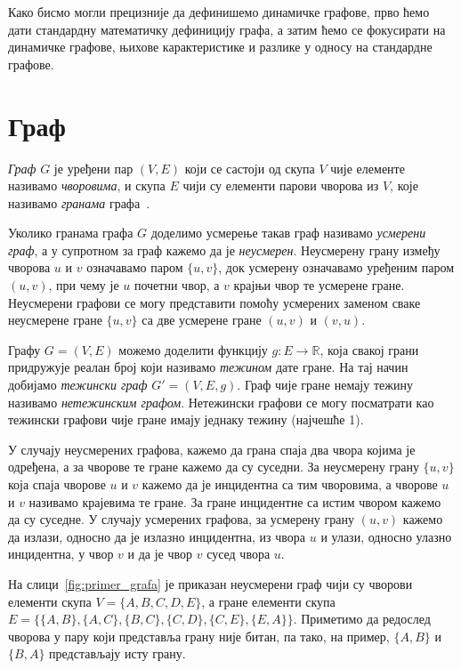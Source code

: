 
Како бисмо могли прецизније да дефинишемо динамичке графове, прво ћемо дати стандардну математичку дефиницију графа, а затим ћемо се фокусирати на динамичке графове, њихове карактеристике и разлике у односу на стандардне графове.

\section{Граф}

\textit{Граф} $G$ је уређени пар $(V,E)$ који се састоји од скупа $V$ чије елементе називамо \emph{чворовима}, и скупа $E$ чији су елементи парови чворова из $V$, које називамо \emph{гранама} графа~\cite{Stanic2020}.

Уколико гранама графа $G$ доделимо усмерење такав граф називамо \textit{усмерени граф}, а у супротном за граф кажемо да је \textit{неусмерен}. Неусмерену грану између чворова $u$ и $v$ означавамо паром $\{u,v\}$, док усмерену означавамо уређеним паром $(u,v)$, при чему је $u$ почетни чвор, а $v$ крајњи чвор те усмерене гране. Неусмерени графови се могу представити помоћу усмерених заменом сваке неусмерене гране $\{u,v\}$ са две усмерене гране $(u,v)$ и $(v,u)$.

Графу $G=(V,E)$ можемо доделити функцију $g: E \to \mathbb{R}$, која свакој грани придружује реалан број који називамо \textit{тежином} дате гране. На тај начин добијамо \textit{тежински граф} $G'=(V,E,g)$. Граф чије гране немају тежину називамо \textit{нетежинским графом}. Нетежински графови се могу посматрати као тежински графови чије гране имају једнаку тежину (најчешће 1). 

У случају неусмерених графова, кажемо да грана спаја два чвора којима је одређена, а за чворове те гране кажемо да су суседни. За неусмерену грану $\{u,v\}$ која спаја чворове $u$ и $v$ кажемо да је инцидентна са тим чворовима, а чворове $u$ и $v$ називамо крајевима те гране. За гране инцидентне са истим чвором кажемо да су суседне. У случају усмерених графова, за усмерену грану $(u,v)$ кажемо да излази, односно да је излазно инцидентна, из чвора $u$ и улази, односно улазно инцидентна, у чвор $v$ и да је чвор $v$ сусед чвора $u$. 

\begin{example}
    \label{ex:primer_neusmerenog_grafa}
    На слици~\ref{fig:primer_grafa} је приказан неусмерени граф чији су чворови елементи скупа $V = \{A,B,C,D,E\}$, а гране елементи скупа $E = \{\{A,B\},\allowbreak \{A,C\},\allowbreak \{B,C\},\allowbreak \{C,D\},\allowbreak \{C,E\},\allowbreak \{E,A\}\}$. Приметимо да редослед чворова у пару који представља грану није битан, па тако, на пример, $\{A,B\}$ и $\{B,A\}$ представљају исту грану.
\end{example} 

